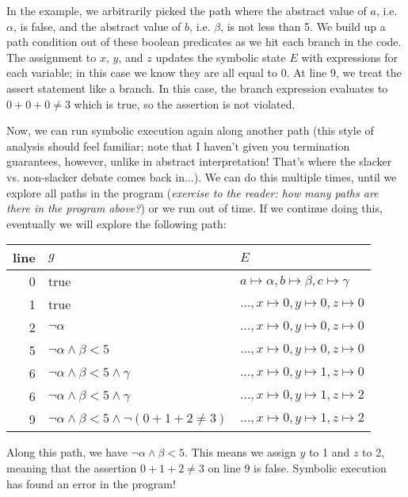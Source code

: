 \documentclass[11pt]{article}
\begin{document}
In the example, we arbitrarily picked the path where the abstract value of $a$,
i.e. $\alpha$, is false, and the abstract value of $b$, i.e. $\beta$, is not
less than 5. We build up a path condition out of these boolean predicates as we
hit each branch in the code. The assignment to $x$, $y$, and $z$ updates the
symbolic state $E$ with expressions for each variable; in this case we know they
are all equal to $0$. At line 9, we treat the assert statement like a branch. In
this case, the branch expression evaluates to $0 + 0 + 0 \neq 3$ which is true,
so the assertion is not violated.

Now, we can run symbolic execution again along another path (this style of
analysis should feel familiar; note that I haven't given you termination
guarantees, however, unlike in abstract interpretation! That's where the slacker
vs. non-slacker debate comes back in...). We can do this multiple times, until
we explore all paths in the program (\textit{exercise to the reader: how many
  paths are there in the program above?}) or we run out of time. If we continue
doing this, eventually we will explore the following path:

\begin{tabular}{ r | l | l }

line & $g$ & $E$\\
\hline
0 & true & $a \mapsto \alpha, b \mapsto \beta, c \mapsto \gamma$ \\
1 & true & $\ldots, x \mapsto 0, y \mapsto 0, z \mapsto 0$ \\
2 & $\lnot \alpha$ & $\ldots, x \mapsto 0, y \mapsto 0, z \mapsto 0$ \\
5 & $\lnot \alpha \land \beta < 5$ & $\ldots, x \mapsto 0, y \mapsto 0, z \mapsto 0$ \\
6 & $\lnot \alpha \land \beta < 5 \land \gamma$ & $\ldots, x \mapsto 0, y \mapsto 1, z \mapsto 0$ \\
6 & $\lnot \alpha \land \beta < 5 \land \gamma$ & $\ldots, x \mapsto 0, y \mapsto 1, z \mapsto 2$ \\
9 & $\lnot \alpha \land \beta < 5 \land \lnot(0 + 1 + 2 \ne 3)$ & $\ldots, x \mapsto 0, y \mapsto 1, z \mapsto 2$ \\

\end{tabular}

Along this path, we have $\lnot \alpha \land \beta < 5$. This means we assign
$y$ to 1 and $z$ to 2, meaning that the assertion $0 + 1 + 2 \ne 3$ on line 9 is
false. Symbolic execution has found an error in the program!
\end{document}
